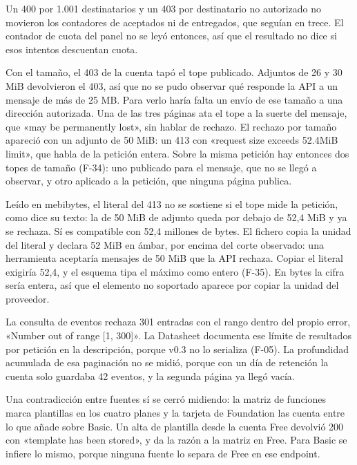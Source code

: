 Un 400 por 1.001 destinatarios y un 403 por destinatario no autorizado no
movieron los contadores de aceptados ni de entregados, que seguían en trece. El contador de cuota
del panel no se leyó entonces, así que el resultado no dice si esos intentos
descuentan cuota.

Con el tamaño, el 403 de la cuenta tapó el tope publicado. Adjuntos de 26 y
30 MiB devolvieron el 403, así que no se pudo observar qué responde la API a un
mensaje de más de 25 MB. Para verlo haría falta un envío de ese tamaño a una dirección autorizada. Una de las tres páginas ata el
tope a la suerte del mensaje, que «may be permanently lost», sin hablar de
rechazo. El rechazo por tamaño apareció con un adjunto de 50 MiB: un 413 con
«request size exceeds 52.4MiB limit», que habla de la petición entera. Sobre la
misma petición hay entonces dos topes de tamaño (F-34): uno publicado para el
mensaje, que no se llegó a observar, y otro aplicado a la petición, que ninguna
página publica.

Leído en mebibytes, el literal del 413 no se sostiene si el tope mide la petición, como dice su texto: la de 50 MiB de adjunto queda por debajo de
52,4 MiB y ya se rechaza. Sí es compatible con 52,4 millones de bytes.
El fichero copia la unidad del literal y declara 52 MiB en ámbar, por encima
del corte observado: una herramienta aceptaría mensajes de 50 MiB que la API
rechaza. Copiar el literal exigiría 52,4, y el esquema tipa el máximo como
entero (F-35). En bytes la cifra sería entera, así que el elemento no soportado aparece por
copiar la unidad del proveedor.

La consulta de eventos rechaza 301 entradas con el rango dentro del propio
error, «Number out of range [1, 300]». La Datasheet documenta ese límite de
resultados por petición en la descripción, porque v0.3 no lo serializa (F-05). La profundidad
acumulada de esa paginación no se midió, porque con un día de retención la
cuenta solo guardaba 42 eventos, y la segunda página ya llegó vacía.

Una contradicción entre fuentes sí se cerró midiendo: la matriz de funciones marca plantillas en los cuatro planes y la tarjeta de Foundation las cuenta entre lo que añade sobre Basic. Un alta de plantilla desde la cuenta Free devolvió 200 con «template has been stored», y da la razón a la matriz en Free.
Para Basic se infiere lo mismo, porque ninguna fuente lo separa de Free en ese
endpoint.

